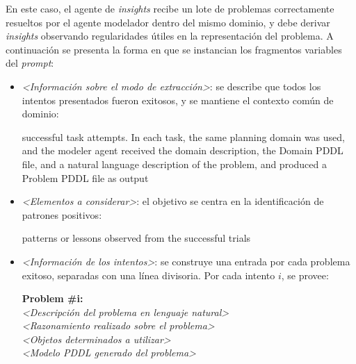 \begin{anexes}
En este caso, el agente de \textit{insights} recibe un lote de problemas correctamente resueltos por el agente modelador dentro del mismo dominio, y debe derivar \textit{insights} observando regularidades útiles en la representación del problema. A continuación se presenta la forma en que se instancian los fragmentos variables del \textit{prompt}:

\begin{itemize}
    \item \textit{<Información sobre el modo de extracción>}: se describe que todos los intentos presentados fueron exitosos, y se mantiene el contexto común de dominio:
\begin{tcolorbox}[colback=gray!10!white, colframe=black, title=Modo de extracción de \textit{insights}, fonttitle=\bfseries, breakable]
successful task attempts. In each task, the same planning domain was used, and the modeler agent received the domain description, the Domain PDDL file, and a natural language description of the problem, and produced a Problem PDDL file as output
\end{tcolorbox}

    \item \textit{<Elementos a considerar>}: el objetivo se centra en la identificación de patrones positivos:
\begin{tcolorbox}[colback=gray!10!white, colframe=black, title=Elementos a considerar, fonttitle=\bfseries, breakable]
patterns or lessons observed from the successful trials
\end{tcolorbox}

    \item \textit{<Información de los intentos>}: se construye una entrada por cada problema exitoso, separadas con una línea divisoria. Por cada intento $i$, se provee:
\begin{tcolorbox}[colback=gray!10!white, colframe=black, title=Información de los intentos exitosos, fonttitle=\bfseries, breakable]
\textbf{Problem \#i:} \\
\textit{<Descripción del problema en lenguaje natural>}\\

\textit{<Razonamiento realizado sobre el problema>}\\

\textit{<Objetos determinados a utilizar>}\\

\textit{<Modelo PDDL generado del problema>}\\
\end{tcolorbox}
\end{itemize}


\end{anexes}

